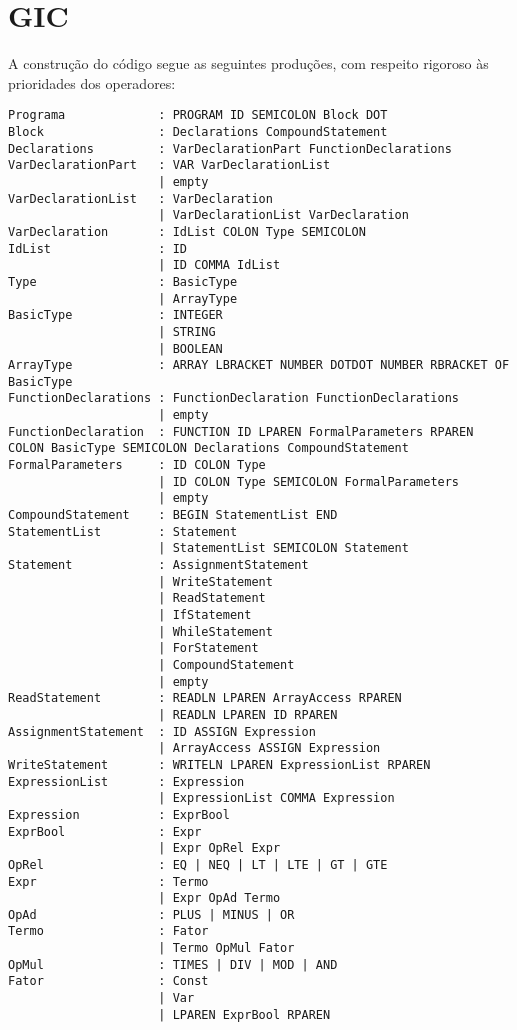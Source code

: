 \documentclass[12pt,a4paper]{report}%
\begin{document}
\section{GIC}
A construção do código segue as seguintes produções, com respeito rigoroso às prioridades dos operadores:
\begin{verbatim}
Programa             : PROGRAM ID SEMICOLON Block DOT
Block                : Declarations CompoundStatement
Declarations         : VarDeclarationPart FunctionDeclarations
VarDeclarationPart   : VAR VarDeclarationList
                     | empty
VarDeclarationList   : VarDeclaration
                     | VarDeclarationList VarDeclaration
VarDeclaration       : IdList COLON Type SEMICOLON
IdList               : ID
                     | ID COMMA IdList
Type                 : BasicType
                     | ArrayType
BasicType            : INTEGER
                     | STRING
                     | BOOLEAN
ArrayType            : ARRAY LBRACKET NUMBER DOTDOT NUMBER RBRACKET OF BasicType
FunctionDeclarations : FunctionDeclaration FunctionDeclarations
                     | empty
FunctionDeclaration  : FUNCTION ID LPAREN FormalParameters RPAREN COLON BasicType SEMICOLON Declarations CompoundStatement
FormalParameters     : ID COLON Type
                     | ID COLON Type SEMICOLON FormalParameters
                     | empty
CompoundStatement    : BEGIN StatementList END
StatementList        : Statement
                     | StatementList SEMICOLON Statement
Statement            : AssignmentStatement
                     | WriteStatement
                     | ReadStatement
                     | IfStatement
                     | WhileStatement
                     | ForStatement
                     | CompoundStatement
                     | empty
ReadStatement        : READLN LPAREN ArrayAccess RPAREN
                     | READLN LPAREN ID RPAREN
AssignmentStatement  : ID ASSIGN Expression
                     | ArrayAccess ASSIGN Expression
WriteStatement       : WRITELN LPAREN ExpressionList RPAREN
ExpressionList       : Expression
                     | ExpressionList COMMA Expression
Expression           : ExprBool
ExprBool             : Expr
                     | Expr OpRel Expr
OpRel                : EQ | NEQ | LT | LTE | GT | GTE
Expr                 : Termo
                     | Expr OpAd Termo
OpAd                 : PLUS | MINUS | OR
Termo                : Fator
                     | Termo OpMul Fator
OpMul                : TIMES | DIV | MOD | AND
Fator                : Const
                     | Var
                     | LPAREN ExprBool RPAREN

\end{verbatim}
\end{document}
